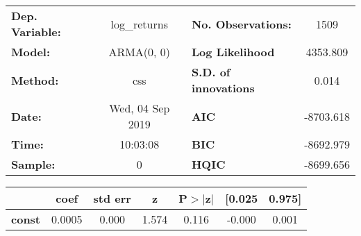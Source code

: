 \begin{center}
\begin{tabular}{lclc}
\toprule
\textbf{Dep. Variable:} &   log\_returns   & \textbf{  No. Observations:  } &    1509     \\
\textbf{Model:}         &    ARMA(0, 0)    & \textbf{  Log Likelihood     } &  4353.809   \\
\textbf{Method:}        &       css        & \textbf{  S.D. of innovations} &   0.014     \\
\textbf{Date:}          & Wed, 04 Sep 2019 & \textbf{  AIC                } & -8703.618   \\
\textbf{Time:}          &     10:03:08     & \textbf{  BIC                } & -8692.979   \\
\textbf{Sample:}        &        0         & \textbf{  HQIC               } & -8699.656   \\
\bottomrule
\end{tabular}
\begin{tabular}{lcccccc}
               & \textbf{coef} & \textbf{std err} & \textbf{z} & \textbf{P$> |$z$|$} & \textbf{[0.025} & \textbf{0.975]}  \\
\midrule
\textbf{const} &       0.0005  &        0.000     &     1.574  &         0.116        &       -0.000    &        0.001     \\
\bottomrule
\end{tabular}
\end{center}
